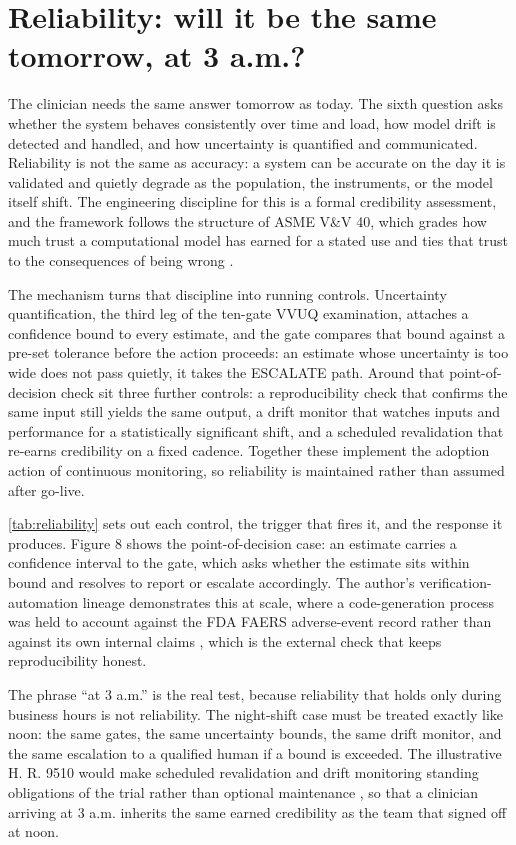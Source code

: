 \section{Reliability: will it be the same tomorrow, at 3 a.m.?}
\label{sec:reliability}

The clinician needs the same answer tomorrow as today. The sixth question asks
whether the system behaves consistently over time and load, how model drift is
detected and handled, and how uncertainty is quantified and communicated.
Reliability is not the same as accuracy: a system can be accurate on the day it is
validated and quietly degrade as the population, the instruments, or the model
itself shift. The engineering discipline for this is a formal credibility
assessment, and the framework follows the structure of ASME V\&V 40, which grades
how much trust a computational model has earned for a stated use and ties that
trust to the consequences of being wrong \cite{asme2018vv40}.

\clearpage

The mechanism turns that discipline into running controls. Uncertainty
quantification, the third leg of the ten-gate VVUQ examination, attaches a
confidence bound to every estimate, and the gate compares that bound against a
pre-set tolerance before the action proceeds: an estimate whose uncertainty is too
wide does not pass quietly, it takes the ESCALATE path. Around that point-of-
decision check sit three further controls: a reproducibility check that confirms
the same input still yields the same output, a drift monitor that watches inputs
and performance for a statistically significant shift, and a scheduled
revalidation that re-earns credibility on a fixed cadence. Together these implement
the adoption action of continuous monitoring, so reliability is maintained rather
than assumed after go-live.

\autoref{tab:reliability} sets out each control, the trigger that fires it, and the
response it produces. Figure 8 shows the point-of-decision case: an estimate
carries a confidence interval to the gate, which asks whether the estimate sits
within bound and resolves to report or escalate accordingly. The author's
verification-automation lineage demonstrates this at scale, where a code-generation
process was held to account against the FDA FAERS adverse-event record rather than
against its own internal claims \cite{Kawchak2025CodeGenerationCompetition16},
which is the external check that keeps reproducibility honest.

The phrase ``at 3 a.m.'' is the real test, because reliability that holds only
during business hours is not reliability. The night-shift case must be treated
exactly like noon: the same gates, the same uncertainty bounds, the same drift
monitor, and the same escalation to a qualified human if a bound is exceeded. The
illustrative H. R. 9510 would make scheduled revalidation and drift monitoring
standing obligations of the trial rather than optional maintenance
\cite{Kawchak2026HR9510Bill}, so that a clinician arriving at 3 a.m. inherits the
same earned credibility as the team that signed off at noon.

